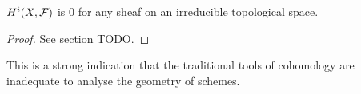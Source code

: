 \begin{proposition}
	$H^i(X, \mathcal{F})$ is 0 for any sheaf on an irreducible topological space.
\end{proposition}
\begin{proof}
	See section TODO.
\end{proof}
This is a strong indication that the traditional tools of cohomology are inadequate to analyse the geometry of schemes.




